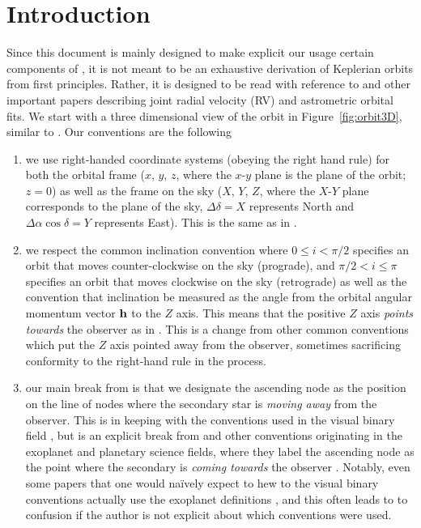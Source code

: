 \documentclass[modern]{aastex61}
\begin{document}
\section{Introduction}
Since this document is mainly designed to make explicit our usage certain components of \citet{murray10}, it is not meant to be an exhaustive derivation of Keplerian orbits from first principles. Rather, it is designed to be read with reference to \citet{murray10} and other important papers describing joint radial velocity (RV) and astrometric orbital fits. We start with a three dimensional view of the orbit in Figure~\ref{fig:orbit3D}, similar to \citet[Figure 7,][]{murray10}. Our conventions are the following
\begin{enumerate}
\item we use right-handed coordinate systems (obeying the right hand rule) for both the orbital frame ($x$, $y$, $z$, where the $x$-$y$ plane is the plane of the orbit; $z = 0$) as well as the frame on the sky ($X$, $Y$, $Z$, where the $X$-$Y$ plane corresponds to the plane of the sky, $\Delta \delta = X$ represents North and $\Delta \alpha \cos \delta = Y$ represents East). This is the same as in \citet{murray10}.
\item we respect the common inclination convention \citep[e.g.,][]{bonneau14} where $0 \leq i < \pi/2$ specifies an orbit that moves counter-clockwise on the sky (prograde), and $\pi/2 < i \leq \pi$ specifies an orbit that moves clockwise on the sky (retrograde) as well as the convention that inclination be measured as the angle from the orbital angular momentum vector ${\bf h}$ to the $Z$ axis. This means that the positive $Z$ axis \emph{points towards} the observer as in \citet{murray10}. This is a change from other common conventions \citep[e.g.,][]{vandekamp81,beauge07,bonneau14} which put the $Z$ axis pointed away from the observer, sometimes sacrificing conformity to the right-hand rule in the process.
\item our main break from \citet{murray10} is that we designate the ascending node as the position on the line of nodes where the secondary star is \emph{moving away} from the observer. This is in keeping with the conventions used in the visual binary field \citep[e.g.,][]{vandekamp81,torres95,pourbaix98}, but is an explicit break from \citet{murray10} and other conventions originating in the exoplanet and planetary science fields, where they label the ascending node as the point where the secondary is \emph{coming towards} the observer \citep[e.g.,][there is a $\pi$ difference between the two conventions]{montet15}.
Notably, even some papers that one would na\"{i}vely expect to hew to the visual binary conventions actually use the exoplanet definitions \citep[e.g.,][]{forveille99,tokovinin03}, and this often leads to to confusion if the author is not explicit about which conventions were used.
\end{enumerate}
\end{document}
